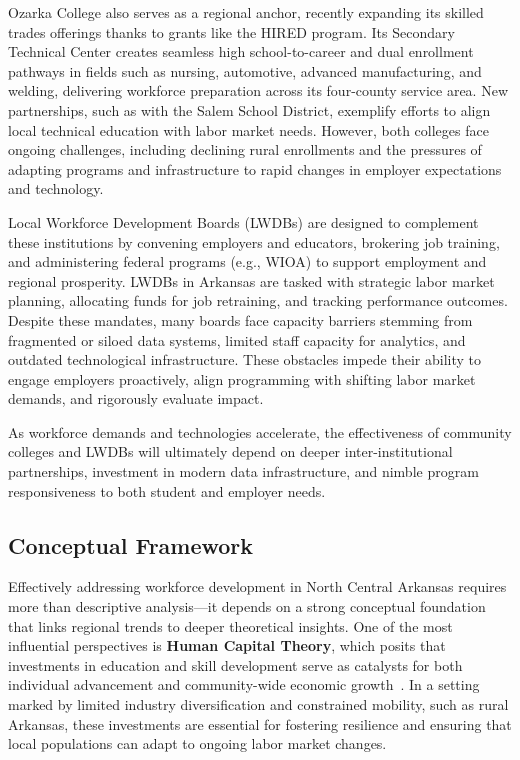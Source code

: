\documentclass{llncs}
\begin{document}
Ozarka College also serves as a regional anchor, recently expanding its skilled trades offerings thanks to grants like the HIRED program\cite{ozarka_news_2025}. Its Secondary Technical Center creates seamless high school-to-career and dual enrollment pathways in fields such as nursing, automotive, advanced manufacturing, and welding, delivering workforce preparation across its four-county service area\cite{ozarka_news_2025,ozarka_programs_2025}. New partnerships, such as with the Salem School District, exemplify efforts to align local technical education with labor market needs\cite{ozarka_news_2025,ozarka_homepage_2025}. However, both colleges face ongoing challenges, including declining rural enrollments and the pressures of adapting programs and infrastructure to rapid changes in employer expectations and technology\cite{wrpdd_plan_2020}.

Local Workforce Development Boards (LWDBs) are designed to complement these institutions by convening employers and educators, brokering job training, and administering federal programs (e.g., WIOA) to support employment and regional prosperity\cite{arkansas_code_1543711}. LWDBs in Arkansas are tasked with strategic labor market planning, allocating funds for job retraining, and tracking performance outcomes\cite{dws_lwdbs_2025}. Despite these mandates, many boards face capacity barriers stemming from fragmented or siloed data systems, limited staff capacity for analytics, and outdated technological infrastructure\cite{results4america_dataaccess_2024,naswa_changingworkforce_2018,wrpdd_plan_2020}. These obstacles impede their ability to engage employers proactively, align programming with shifting labor market demands, and rigorously evaluate impact\cite{results4america_dataaccess_2024,wrpdd_plan_2020}.

As workforce demands and technologies accelerate, the effectiveness of community colleges and LWDBs will ultimately depend on deeper inter-institutional partnerships, investment in modern data infrastructure, and nimble program responsiveness to both student and employer needs.

\subsection{Conceptual Framework}\label{subsec:conceptual_frame}

Effectively addressing workforce development in North Central Arkansas requires more than descriptive analysis—it depends on a strong conceptual foundation that links regional trends to deeper theoretical insights. One of the most influential perspectives is \textbf{Human Capital Theory}, which posits that investments in education and skill development serve as catalysts for both individual advancement and community-wide economic growth~\cite{becker_humancapital_1975,nickerson_functionalist_2024}. In a setting marked by limited industry diversification and constrained mobility, such as rural Arkansas, these investments are essential for fostering resilience and ensuring that local populations can adapt to ongoing labor market changes.
\end{document}
